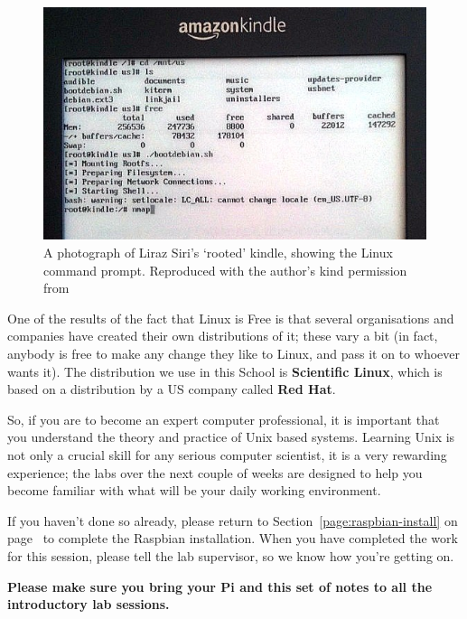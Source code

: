 \begin{figure}[h!tb]
  \begin{center}
    \includegraphics[width=13cm]{images/kindleroot}
  \end{center}
\caption{A photograph of Liraz Siri's `rooted' kindle, showing the Linux command prompt. Reproduced with the author's kind permission from }
\label{fig:kindlelinux}
\end{figure}

One of the results of the fact that Linux is Free is that several
organisations and companies have created their own distributions of
it; these vary a bit (in fact, anybody is free to make any change they
like to Linux, and pass it on to whoever wants it). The distribution
we use in this School is \textbf{Scientific Linux}, which is
based on a distribution by a
US company called \textbf{Red Hat}.

So, if you are to become an expert computer professional, it is
important that you understand the theory and practice of Unix based
systems. Learning Unix is not only a crucial skill for any serious
computer scientist, it is a very rewarding experience; the labs over
the next couple of weeks are designed to help you become familiar with what will be your daily working environment.

If you haven't done so already, please return to Section~\ref{page:raspbian-install} on page~\pageref{page:raspbian-install} to complete the Raspbian installation. When you have completed the work for this session, please tell the lab supervisor, so we know how you're getting on.

\textbf{Please make sure you bring your Pi and this set of notes to all the introductory lab sessions.}
